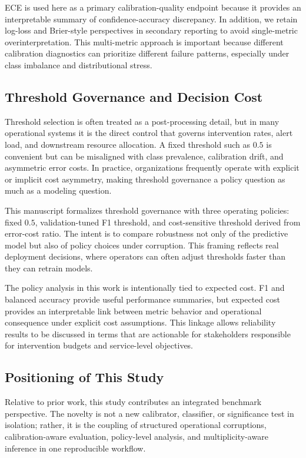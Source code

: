 \documentclass{AuthorGuide/ijitcs}
\begin{document}
ECE is used here as a primary calibration-quality endpoint because it provides an interpretable summary of confidence-accuracy discrepancy. In addition, we retain log-loss and Brier-style perspectives in secondary reporting to avoid single-metric overinterpretation. This multi-metric approach is important because different calibration diagnostics can prioritize different failure patterns, especially under class imbalance and distributional stress.

\subsection{Threshold Governance and Decision Cost}
Threshold selection is often treated as a post-processing detail, but in many operational systems it is the direct control that governs intervention rates, alert load, and downstream resource allocation. A fixed threshold such as $0.5$ is convenient but can be misaligned with class prevalence, calibration drift, and asymmetric error costs. In practice, organizations frequently operate with explicit or implicit cost asymmetry, making threshold governance a policy question as much as a modeling question.

This manuscript formalizes threshold governance with three operating policies: fixed $0.5$, validation-tuned F1 threshold, and cost-sensitive threshold derived from error-cost ratio. The intent is to compare robustness not only of the predictive model but also of policy choices under corruption. This framing reflects real deployment decisions, where operators can often adjust thresholds faster than they can retrain models.

The policy analysis in this work is intentionally tied to expected cost. F1 and balanced accuracy provide useful performance summaries, but expected cost provides an interpretable link between metric behavior and operational consequence under explicit cost assumptions. This linkage allows reliability results to be discussed in terms that are actionable for stakeholders responsible for intervention budgets and service-level objectives.

\subsection{Positioning of This Study}
Relative to prior work, this study contributes an integrated benchmark perspective. The novelty is not a new calibrator, classifier, or significance test in isolation; rather, it is the coupling of structured operational corruptions, calibration-aware evaluation, policy-level analysis, and multiplicity-aware inference in one reproducible workflow.
\end{document}
